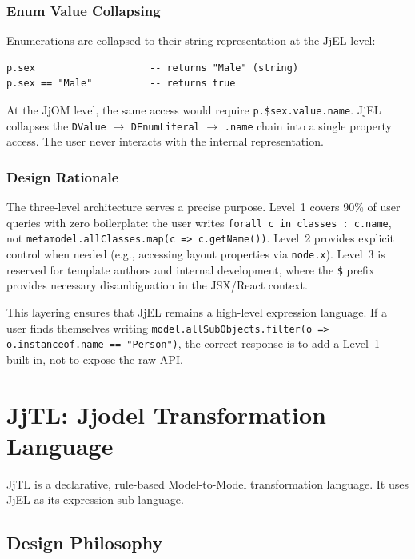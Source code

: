 \documentclass[11pt,a4paper]{article}
\newcommand{\jjel}{\textsf{JjEL}}
\newcommand{\jjtl}{\textsf{JjTL}}
\begin{document}
\subsubsection{Enum Value Collapsing}

Enumerations are collapsed to their string representation at the \jjel{} level:

\begin{lstlisting}[style=jjel,numbers=none]
p.sex                    -- returns "Male" (string)
p.sex == "Male"          -- returns true
\end{lstlisting}

At the JjOM level, the same access would require \texttt{p.\$sex.value.name}. \jjel{} collapses the \texttt{DValue} $\to$ \texttt{DEnumLiteral} $\to$ \texttt{.name} chain into a single property access. The user never interacts with the internal representation.

\subsubsection{Design Rationale}

The three-level architecture serves a precise purpose. Level~1 covers 90\% of user queries with zero boilerplate: the user writes \texttt{forall c in classes : c.name}, not \texttt{metamodel.allClasses.map(c => c.getName())}. Level~2 provides explicit control when needed (e.g., accessing layout properties via \texttt{node.x}). Level~3 is reserved for template authors and internal development, where the \texttt{\$} prefix provides necessary disambiguation in the JSX/React context.

This layering ensures that \jjel{} remains a high-level expression language. If a user finds themselves writing \texttt{model.allSubObjects.filter(o => o.instanceof.name == "Person")}, the correct response is to add a Level~1 built-in, not to expose the raw API.


\section{JjTL: Jjodel Transformation Language}\label{sec:jjtl}

\jjtl{} is a declarative, rule-based Model-to-Model transformation language. It uses \jjel{} as its expression sub-language.

\subsection{Design Philosophy}
\end{document}
